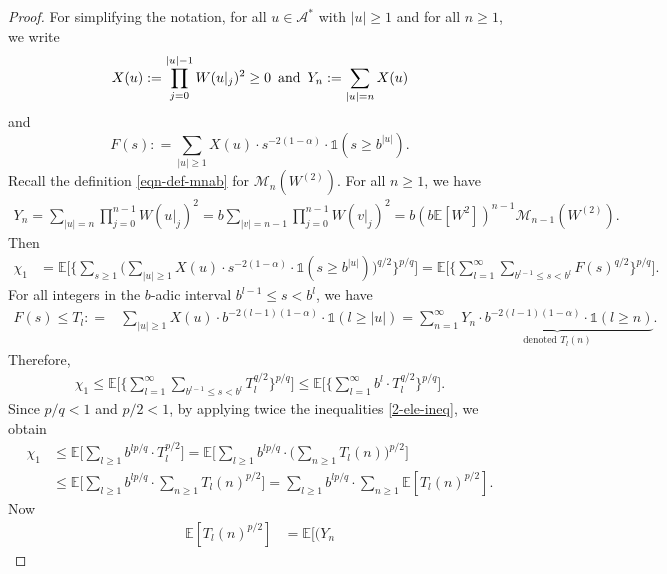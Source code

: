 \documentclass[12pt]{amsart}
\theoremstyle{definition}
\theoremstyle{remark}
\newcommand{\E}{\mathbb{E}}
\newcommand{\MAA}{\mathscr{M}_{n-1}(W^{(2)})}
\newcommand{\MAB}{\mathscr{M}_{n}(W^{(2)})}
\newcommand{\Ab}{\mathcal{A}}
\newcommand{\an}{\text{\, and \,}}
\newcommand{\indi}{\mathds{1}}
\numberwithin{equation}{section}
\begin{document}
\begin{proof}

For simplifying the notation, for all $u\in \Ab^*$ with $|u|\ge 1$ and for all $n\ge 1$, we write 
\begin{align}\label{def-Xu}
X(u) : =  \prod_{j=0}^{|u|-1} W(u|_j)^2  \ge 0  \an Y_n: = \sum_{|u|=n} X(u)
\end{align}
and 
\[
F(s): = \sum_{|u|\ge 1}   X(u)   \cdot    s^{-2 (1 -\alpha)} \cdot  \indi (s  \ge  b^{|u|}).
\]
Recall the definition \eqref{eqn-def-mnab} for $\MAB$.  For all $n\ge 1$, we have 
\begin{align}\label{Yn-Mn}
Y_n = \sum_{|u|=n} \prod_{j=0}^{n-1} W(u|_j)^2 =    b  \sum_{|v|=n-1}  \prod_{j=0}^{n-1} W(v|_j)^2 =   b( b \E[W^2])^{n-1}    \MAA.
\end{align}
Then
\begin{align*}
\chi_1 & =   \E \Big[   \Big\{   \sum_{s \ge 1}       \Big(   \sum_{|u|\ge 1}   X(u)   \cdot    s^{-2 (1 -\alpha)} \cdot  \indi (s \ge b^{|u|}) \Big)^{q/2}  \Big\}^{p/q}\Big]
= \E \Big[   \Big\{     \sum_{l  = 1}^\infty    \sum_{b^{l-1} \le s < b^{l}}  F(s)^{q/2} \Big\}^{p/q}\Big].
\end{align*}
For all integers in the  $b$-adic interval $b^{l-1}\le s < b^l$, we have
\begin{align*}
F(s)\le  T_l: =  & \sum_{|u|\ge 1} X(u)
\cdot   b^{-2(l-1)(1 - \alpha)}  \cdot \indi(l \ge |u|)  =  \sum_{n=1}^\infty   \underbrace{ Y_n
\cdot   b^{-2(l-1)(1 - \alpha)}  \cdot \indi(l  \ge n)}_{\text{denoted $T_l(n)$}}. 
\end{align*}
Therefore, 
\begin{align*}
\chi_1 \le  \E \Big[   \Big\{     \sum_{l  = 1}^\infty    \sum_{b^{l-1} \le s < b^{l}}  T_l^{q/2} \Big\}^{p/q}\Big] \le  \E \Big[   \Big\{    \sum_{l  = 1}^\infty    b^l  \cdot T_l^{q/2} \Big\}^{p/q}\Big].
\end{align*}
Since $p/q<1$ and $p/2<1$, by applying twice the inequalities \eqref{2-ele-ineq}, we obtain 
\begin{align*}
\chi_1 & \le \E \Big[  \sum_{l\ge 1}    b^{lp/q}  \cdot T_l^{p/2} \Big]  =  \E \Big[  \sum_{l  \ge 1}    b^{lp/q}  \cdot  \Big(\sum_{n\ge 1} T_l(n)\Big)^{p/2} \Big] 
\\
& \le \E \Big[  \sum_{l  \ge 1}    b^{lp/q}  \cdot  \sum_{n\ge 1} T_l(n)^{p/2}  \Big] =  \sum_{l  \ge 1}   b^{lp/q}  \cdot  \sum_{n\ge 1}   \E[T_l(n)^{p/2}]. 
\end{align*}
Now 
\begin{align*}
 \E[T_l(n)^{p/2}]  &   = \E \Big[   \Big(Y_n

\end{align*}
\end{proof}
\end{document}
